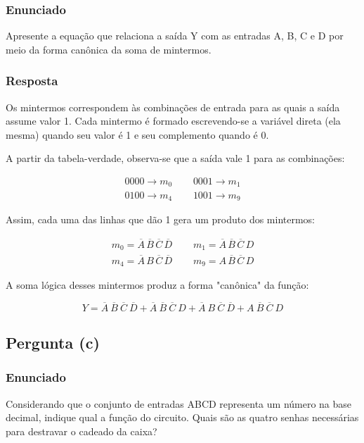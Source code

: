 \documentclass[12pt]{article}
\begin{document}
\subsubsection*{Enunciado}
Apresente a equação que relaciona a saída Y com as entradas A, B, C e D
por meio da forma canônica da soma de mintermos.

\subsubsection*{Resposta}
Os mintermos correspondem às combinações de entrada para as quais a saída assume valor 1. Cada mintermo é formado escrevendo-se a variável direta (ela mesma) quando seu valor é 1 e seu complemento quando é 0.

A partir da tabela-verdade, observa-se que a saída vale 1 para as combinações:

\[
\begin{array}{cc}
0000 \rightarrow m_0 \ \ \ & \ \ \ 0001 \rightarrow m_1 \\
0100 \rightarrow m_4 \ \ \ & \ \ \ 1001 \rightarrow m_9
\end{array}
\]

Assim, cada uma das linhas que dão 1 gera um produto dos mintermos:

\[
\begin{array}{cc}
m_0 = \overline{A}\,\overline{B}\,\overline{C}\,\overline{D}
\ \ \ & \ \ \ 
m_1 = \overline{A}\,\overline{B}\,\overline{C}\,D
\\[0.4em]
m_4 = \overline{A}\,B\,\overline{C}\,\overline{D}
 \ \ \ & \ \ \ 
m_9 = A\,\overline{B}\,\overline{C}\,D
\end{array}
\]

A soma lógica desses mintermos produz a forma "canônica" da função:

\begin{equation}
Y = \overline{A} \ \overline{B} \ \overline{C} \ \overline{D} + \overline{A} \ \overline{B} \ \overline{C} \ D + \overline{A} \ B \ \overline{C} \ \overline{D} + A \ \overline{B} \ \overline{C} \ D
\label{equação lógica 2}
\end{equation}

\subsection{Pergunta (c)}

\subsubsection*{Enunciado}
Considerando que o conjunto de entradas ABCD representa um número
na base decimal, indique qual a função do circuito. Quais são as quatro senhas
necessárias para destravar o cadeado da caixa?
\end{document}
